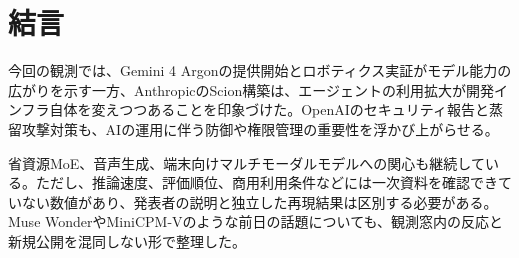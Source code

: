 \section*{結言}
今回の観測では、Gemini 4 Argonの提供開始とロボティクス実証がモデル能力の広がりを示す一方、AnthropicのScion構築は、エージェントの利用拡大が開発インフラ自体を変えつつあることを印象づけた。OpenAIのセキュリティ報告と蒸留攻撃対策も、AIの運用に伴う防御や権限管理の重要性を浮かび上がらせる。

省資源MoE、音声生成、端末向けマルチモーダルモデルへの関心も継続している。ただし、推論速度、評価順位、商用利用条件などには一次資料を確認できていない数値があり、発表者の説明と独立した再現結果は区別する必要がある。Muse WonderやMiniCPM-Vのような前日の話題についても、観測窓内の反応と新規公開を混同しない形で整理した。
